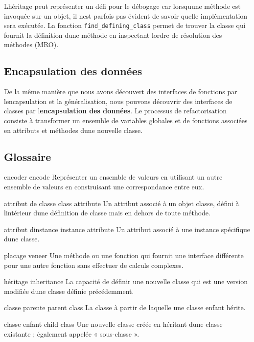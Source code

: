 L\textquotesingle héritage peut représenter un défi pour le débogage car
lorsqu\textquotesingle une méthode est invoquée sur un objet, il
n\textquotesingle est parfois pas évident de savoir quelle
implémentation sera exécutée. La fonction \texttt{find\_defining\_class}
permet de trouver la classe qui fournit la définition
d\textquotesingle une méthode en inspectant l\textquotesingle ordre de
résolution des méthodes (MRO).

\hypertarget{encapsulation-des-donnuxe9es}{%
\subsection{Encapsulation des
données}\label{encapsulation-des-donnuxe9es}}

De la même manière que nous avons découvert des interfaces de fonctions
par l\textquotesingle encapsulation et la généralisation, nous pouvons
découvrir des interfaces de classes par
l\textquotesingle{}\textbf{encapsulation des données}. Le processus de
refactorisation consiste à transformer un ensemble de variables globales
et de fonctions associées en attributs et méthodes d\textquotesingle une
nouvelle classe.

\hypertarget{glossaire}{%
\subsection{Glossaire}\label{glossaire}}

encoder encode Représenter un ensemble de valeurs en utilisant un autre
ensemble de valeurs en construisant une correspondance entre eux.

attribut de classe class attribute Un attribut associé à un objet
classe, défini à l\textquotesingle intérieur d\textquotesingle une
définition de classe mais en dehors de toute méthode.

attribut d\textquotesingle instance instance attribute Un attribut
associé à une instance spécifique d\textquotesingle une classe.

placage veneer Une méthode ou une fonction qui fournit une interface
différente pour une autre fonction sans effectuer de calculs complexes.

héritage inheritance La capacité de définir une nouvelle classe qui est
une version modifiée d\textquotesingle une classe définie précédemment.

classe parente parent class La classe à partir de laquelle une classe
enfant hérite.

classe enfant child class Une nouvelle classe créée en héritant
d\textquotesingle une classe existante ; également appelée « sous-classe
».

